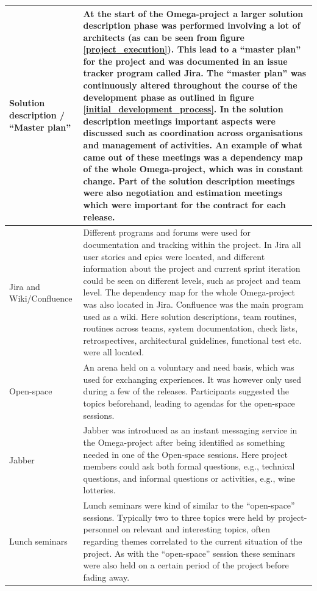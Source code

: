 \begin{center}
\begin{longtable}{| p{6cm} | p{9cm} |}
    Solution description / ``Master plan'' & At the start of the Omega-project a larger solution description phase was performed involving a lot of architects (as can be seen from figure \ref{project_execution}). This lead to a ``master plan'' for the project and was documented in an issue tracker program called Jira. The ``master plan'' was continuously altered throughout the course of the development phase as outlined in figure \ref{initial_development_process}. In the solution description meetings important aspects were discussed such as coordination across organisations and management of activities. An example of what came out of these meetings was a dependency map of the whole Omega-project, which was in constant change. Part of the solution description meetings were also negotiation and estimation meetings which were important for the contract for each release. \\ \hline
    Jira and Wiki/Confluence & Different programs and forums were used for documentation and tracking within the project. In Jira all user stories and epics were located, and different information about the project and current sprint iteration could be seen on different levels, such as project and team level. The dependency map for the whole Omega-project was also located in Jira. Confluence was the main program used as a wiki. Here solution descriptions, team routines, routines across teams, system documentation, check lists, retrospectives, architectural guidelines, functional test etc. were all located. \\ \hline
    Open-space & An arena held on a voluntary and need basis, which was used for exchanging experiences. It was however only used during a few of the releases. Participants suggested the topics beforehand, leading to agendas for the open-space sessions. \\ \hline
    Jabber & Jabber was introduced as an instant messaging service in the Omega-project after being identified as something needed in one of the Open-space sessions. Here project members could ask both formal questions, e.g., technical questions, and informal questions or activities, e.g., wine lotteries. \\ \hline
    Lunch seminars & Lunch seminars were kind of similar to the ``open-space'' sessions. Typically two to three topics were held by project-personnel on relevant and interesting topics, often regarding themes correlated to the current situation of the project. As with the ``open-space'' session these seminars were also held on a certain period of the project before fading away. \\ \hline

\end{longtable}
\end{center}

